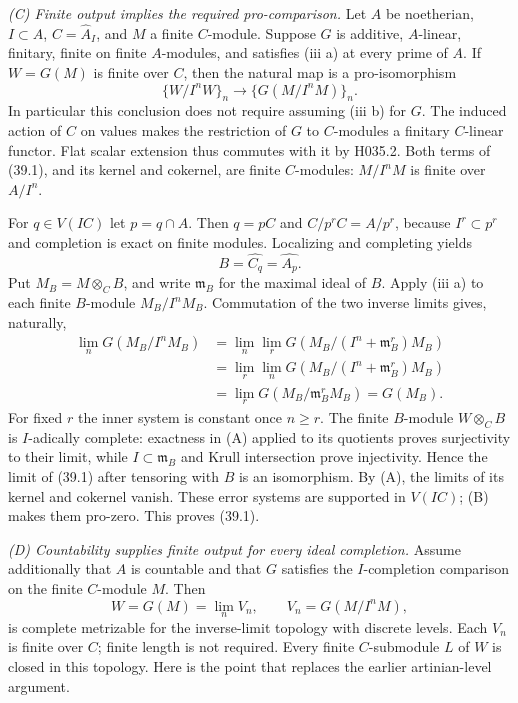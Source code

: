 \emph{(C) Finite output implies the required pro-comparison.}
Let $A$ be noetherian, $I\subset A$, $C=\widehat A_I$, and $M$ a
finite $C$-module. Suppose $G$ is additive, $A$-linear, finitary, finite
on finite $A$-modules, and satisfies (iii a) at every prime of $A$.
If $W=G(M)$ is finite over $C$, then the natural map is a pro-isomorphism
\[
 \{W/I^nW\}_n\longrightarrow\{G(M/I^nM)\}_n.                 \tag{39.1}
\]
In particular this conclusion does not require assuming (iii b) for $G$.
The induced action of $C$ on values makes the restriction of $G$ to
$C$-modules a finitary $C$-linear functor. Flat scalar extension thus
commutes with it by H035.2. Both terms of (39.1), and its kernel and
cokernel, are finite $C$-modules: $M/I^nM$ is finite over $A/I^n$.

For $q\in V(IC)$ let $p=q\cap A$. Then $q=pC$ and
$C/p^rC=A/p^r$, because $I^r\subset p^r$ and completion is exact
on finite modules. Localizing and completing yields
\[
 B=\widehat{C_q}=\widehat{A_p}.
\]
Put $M_B=M\otimes_C B$, and write $\mathfrak m_B$ for the maximal
ideal of $B$. Apply (iii a) to each finite $B$-module $M_B/I^nM_B$.
Commutation of the two inverse limits gives, naturally,
\begin{align*}
 \lim_n G(M_B/I^nM_B)
 &=\lim_n\lim_r G(M_B/(I^n+\mathfrak m_B^r)M_B)\\
 &=\lim_r\lim_n G(M_B/(I^n+\mathfrak m_B^r)M_B)\\
 &=\lim_r G(M_B/\mathfrak m_B^rM_B)=G(M_B).
\end{align*}
For fixed $r$ the inner system is constant once $n\geq r$.
The finite $B$-module $W\otimes_C B$ is $I$-adically complete:
exactness in (A) applied to its quotients proves surjectivity to their
limit, while $I\subset\mathfrak m_B$ and Krull intersection prove
injectivity. Hence the limit of (39.1) after tensoring with $B$ is
an isomorphism. By (A), the limits of its kernel and cokernel vanish.
These error systems are supported in $V(IC)$; (B) makes them pro-zero.
This proves (39.1).

\emph{(D) Countability supplies finite output for every ideal completion.}
Assume additionally that $A$ is countable and that $G$ satisfies the
$I$-completion comparison on the finite $C$-module $M$. Then
\[
 W=G(M)=\lim_n V_n,\qquad V_n=G(M/I^nM),
\]
is complete metrizable for the inverse-limit topology with discrete
levels. Each $V_n$ is finite over $C$; finite length is not required.
Every finite $C$-submodule $L$ of $W$ is closed in this topology.
Here is the point that replaces the earlier artinian-level argument.

